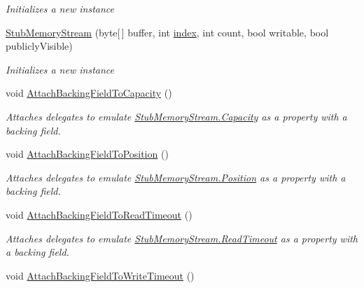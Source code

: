 \begin{DoxyCompactItemize}
\begin{DoxyCompactList}\small\item\em Initializes a new instance\end{DoxyCompactList}\item 
\hyperlink{class_system_1_1_i_o_1_1_fakes_1_1_stub_memory_stream_a8274142fc51d521556a903b8ee46b1b2}{Stub\-Memory\-Stream} (byte\mbox{[}$\,$\mbox{]} buffer, int \hyperlink{jquery-1_810_82-vsdoc_8js_a75bb12d1f23302a9eea93a6d89d0193e}{index}, int count, bool writable, bool publicly\-Visible)
\begin{DoxyCompactList}\small\item\em Initializes a new instance\end{DoxyCompactList}\item 
void \hyperlink{class_system_1_1_i_o_1_1_fakes_1_1_stub_memory_stream_a3fc8452e4a74469439ebcfdeab2c75ba}{Attach\-Backing\-Field\-To\-Capacity} ()
\begin{DoxyCompactList}\small\item\em Attaches delegates to emulate \hyperlink{class_system_1_1_i_o_1_1_fakes_1_1_stub_memory_stream_aee62f3d23d2702c7759150b915cfe225}{Stub\-Memory\-Stream.\-Capacity} as a property with a backing field.\end{DoxyCompactList}\item 
void \hyperlink{class_system_1_1_i_o_1_1_fakes_1_1_stub_memory_stream_abf3db75d1c68a104731dc3bd6d658f6e}{Attach\-Backing\-Field\-To\-Position} ()
\begin{DoxyCompactList}\small\item\em Attaches delegates to emulate \hyperlink{class_system_1_1_i_o_1_1_fakes_1_1_stub_memory_stream_aa7e67c4cc12927ae84ad2d5550c10ab2}{Stub\-Memory\-Stream.\-Position} as a property with a backing field.\end{DoxyCompactList}\item 
void \hyperlink{class_system_1_1_i_o_1_1_fakes_1_1_stub_memory_stream_a13db4b7081c3f782c0e7ad5559fd1db9}{Attach\-Backing\-Field\-To\-Read\-Timeout} ()
\begin{DoxyCompactList}\small\item\em Attaches delegates to emulate \hyperlink{class_system_1_1_i_o_1_1_fakes_1_1_stub_memory_stream_afdbda53fd5c02af1ab0627180fe4aa55}{Stub\-Memory\-Stream.\-Read\-Timeout} as a property with a backing field.\end{DoxyCompactList}\item 
void \hyperlink{class_system_1_1_i_o_1_1_fakes_1_1_stub_memory_stream_a20b435e40b4a8e1153431c1739afc73b}{Attach\-Backing\-Field\-To\-Write\-Timeout} ()

\end{DoxyCompactItemize}

